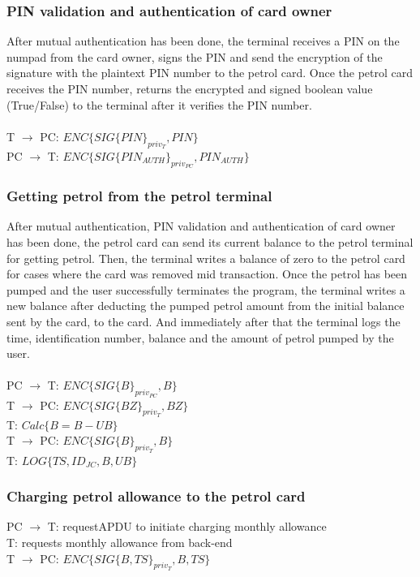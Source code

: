 \subsubsection{PIN validation and authentication of card owner}
After mutual authentication has been done, the terminal receives a PIN on the numpad from the card owner, signs the PIN and send the encryption of the signature with the plaintext PIN number to the petrol card. Once the petrol card receives the PIN number, returns the encrypted and signed boolean value (True/False) to the terminal after it verifies the PIN number.
\\
\\
T $\to$ PC: $ENC\{SIG\{PIN\}_{priv_T}, PIN\}$\\
PC $\to$ T: $ENC\{SIG\{PIN_{AUTH}\}_{priv_{PC}}, PIN_{AUTH}\}$

\subsubsection{Getting petrol from the petrol terminal}
After mutual authentication, PIN validation and authentication of card owner has been done, the petrol card can send its current balance to the petrol terminal for getting petrol. Then, the terminal writes a balance of zero to the petrol card for cases where the card was removed mid transaction. Once the petrol has been pumped and the user successfully terminates the program, the terminal writes a new balance after deducting the pumped petrol amount from the initial balance sent by the card, to the card. And immediately after that the terminal logs the time, identification number, balance and the amount of petrol pumped by the user.
\\
\\
PC $\to$ T: $ENC\{SIG\{B\}_{priv_{PC}}, B\}$\\
T $\to$ PC: $ENC\{SIG\{BZ\}_{priv_T}, BZ\}$\\
T: $Calc\{B = B - UB\}$\\
T $\to$ PC: $ENC\{SIG\{B\}_{priv_T}, B\}$\\
T: $LOG\{TS, ID_{JC}, B, UB\}$

\subsubsection{Charging petrol allowance to the petrol card}
PC $\to$ T: requestAPDU to initiate charging monthly allowance \\
T: requests monthly allowance from back-end \\
T $\to$ PC: $ENC\{SIG\{B,TS\}_{priv_T}, B, TS\}$
